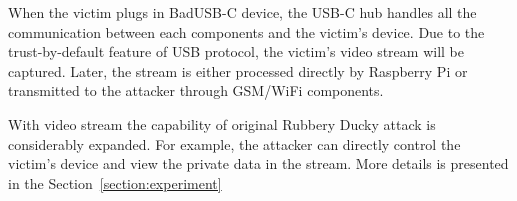 When the victim plugs in BadUSB-C device, the USB-C hub handles all the communication between each components and the victim's device. Due to the trust-by-default feature of USB protocol, the victim's video stream will be captured. Later, the stream is either processed directly by Raspberry Pi or transmitted to the attacker through GSM/WiFi components.

With video stream the capability of original Rubbery Ducky attack is considerably expanded. For example, the attacker can directly control the victim's device and view the private data in the stream. More details is presented in the Section~\ref{section:experiment}